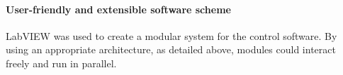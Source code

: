 \paragraph{User-friendly and extensible software scheme}
LabVIEW was used to create a modular system for the control software.
By using an appropriate architecture, as detailed above, modules could interact freely and run in parallel.

%
%
%
%
%
%
%
